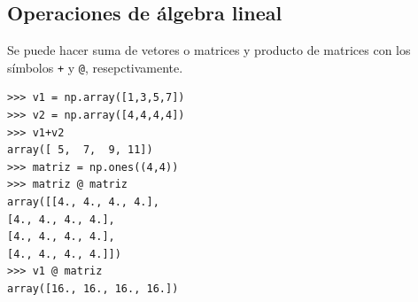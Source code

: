 \documentclass[a4paper, 12pt]{report}
\theoremstyle{definition}
\begin{document}
\subsection{Operaciones de álgebra lineal}

Se puede hacer suma de vetores o matrices y producto de matrices con los símbolos {\tt +} y {\tt @}, resepctivamente.
\begin{verbatim}
>>> v1 = np.array([1,3,5,7])
>>> v2 = np.array([4,4,4,4])
>>> v1+v2
array([ 5,  7,  9, 11])
>>> matriz = np.ones((4,4))
>>> matriz @ matriz
array([[4., 4., 4., 4.],
[4., 4., 4., 4.],
[4., 4., 4., 4.],
[4., 4., 4., 4.]])
>>> v1 @ matriz
array([16., 16., 16., 16.])
\end{verbatim}
\end{document}
